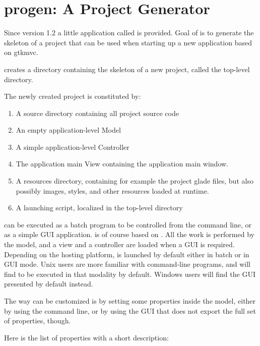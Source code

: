 \section{progen: A Project Generator}

Since version 1.2 a little application called 
is provided. Goal of  is to generate the skeleton
of a project that can be used when starting up a new application
based on gtkmvc.

 creates a directory containing the skeleton of a
new project, called the top-level directory.

The newly created project is constituted by:
\begin{enumerate}
\item A source directory containing all project source code
\item An empty application-level Model
\item A simple application-level Controller
\item The application main View containing the application main window. 
\item A resources directory, containing for example the project
  glade files, but also possibly images, styles, and other resources
  loaded at runtime.
\item A launching script, localized in the top-level directory
\end{enumerate}


 can be executed as a batch program to be
controlled from the command line, or as a simple GUI
application.  is of course based on \pygtkmvc. All
the work is performed by the model, and a view and a controller are
loaded when a GUI is required. Depending on the hosting platform,
 is launched by default either in batch or in GUI
mode. Unix users are more familiar with command-line programs, and
will find  to be executed in that modality by
default. Windows users will find the GUI presented by default
instead.

The way  can be customized is by setting some
properties inside the model, either by using the command line, or by
using the GUI that does not export the full set of properties,
though.

Here is the list of properties with a short description:

